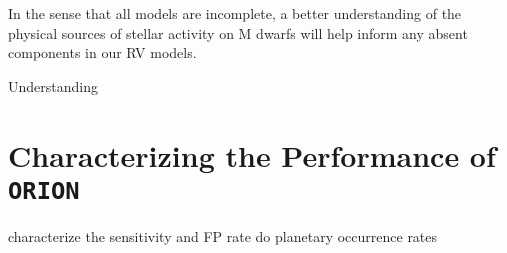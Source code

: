 In the sense that all models are incomplete, a better understanding of the
physical sources of stellar activity on M dwarfs will help inform any absent
components in our RV models. 

Understanding


\section{Characterizing the Performance of \texttt{ORION}}
characterize the sensitivity and FP rate
do planetary occurrence rates

